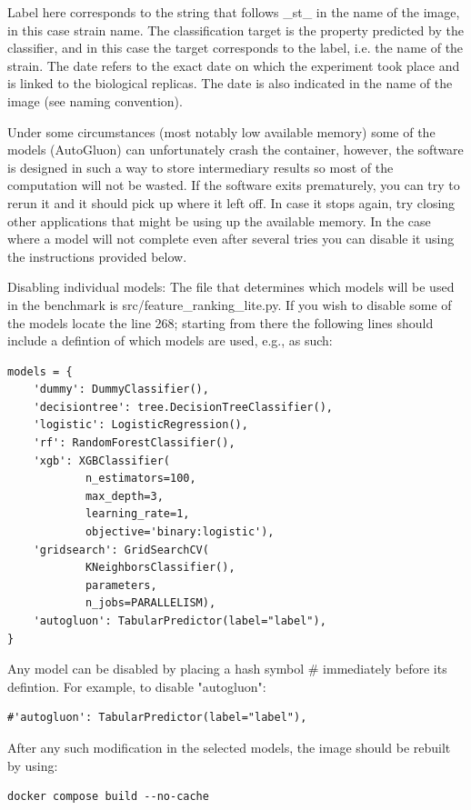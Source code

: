 \documentclass{ol-softwaremanual}
\begin{document}
Label here corresponds to the string that follows \_st\_ in the name of the image, in this case strain name. The classification target is the property predicted by the classifier, and in this case the target corresponds to the label, i.e. the name of the strain. The date refers to the exact date on which the experiment took place and is linked to the biological replicas. The date is also indicated in the name of the image (see naming convention). 

Under some circumstances (most notably low available memory) some of the models (AutoGluon) can unfortunately crash the container, however, the software is designed in such a way to store intermediary results so most of the computation will not be wasted. If the software exits prematurely, you can try to rerun it and it should pick up where it left off. In case it stops again, try closing other applications that might be using up the available memory. In the case where a model will not complete even after several tries you can disable it using the instructions provided below.

Disabling individual models:
The file that determines which models will be used in the benchmark is src/feature\_ranking\_lite.py. If you wish to disable some of the models locate the line 268; starting from there the following lines should include a defintion of which models are used, e.g., as such:

\begin{verbatim}
models = {
	'dummy': DummyClassifier(),
	'decisiontree': tree.DecisionTreeClassifier(),
	'logistic': LogisticRegression(),
	'rf': RandomForestClassifier(),
	'xgb': XGBClassifier(
	        n_estimators=100,
			max_depth=3, 
			learning_rate=1, 
			objective='binary:logistic'),
	'gridsearch': GridSearchCV(
			KNeighborsClassifier(), 
			parameters, 
			n_jobs=PARALLELISM),
	'autogluon': TabularPredictor(label="label"),
}
\end{verbatim}

Any model can be disabled by placing a hash symbol \# immediately before its defintion. For example, to disable "autogluon":
\begin{verbatim}
#'autogluon': TabularPredictor(label="label"),
\end{verbatim}

After any such modification in the selected models, the image should be rebuilt by using:
\begin{verbatim}
docker compose build --no-cache
\end{verbatim}
\end{document}
